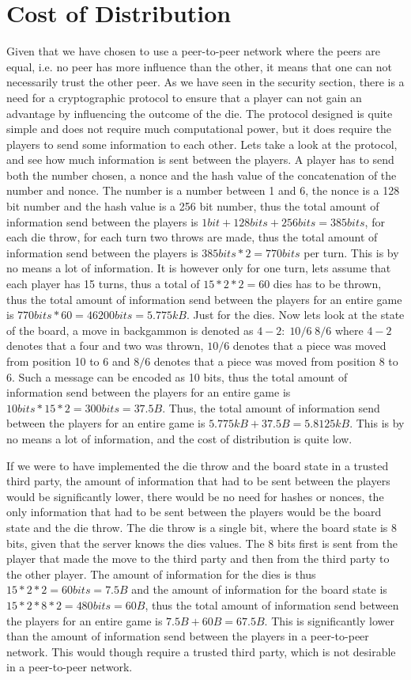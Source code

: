 \documentclass[ twoside,openright,titlepage,numbers=noenddot,headinclude,%
                footinclude=true,cleardoublepage=empty,abstractoff, %
                BCOR=5mm,paper=a4,fontsize=11pt,%
                ngerman,american,%
                ]{scrreprt}
\begin{document}
\section{Cost of Distribution}
Given that we have chosen to use a peer-to-peer network where the peers are equal, i.e. no peer has more influence than the other, it means that one can not necessarily trust the other peer. As we have seen in the security section, there is a need for a cryptographic protocol to ensure that a player can not gain an advantage by influencing the outcome of the die. The protocol designed is quite simple and does not require much computational power, but it does require the players to send some information to each other. Lets take a look at the protocol, and see how much information is sent between the players. A player has to send both the number chosen, a nonce and the hash value of the concatenation of the number and nonce. The number is a number between 1 and 6, the nonce is a 128 bit number and the hash value is a 256 bit number, thus the total amount of information send between the players is $1bit+128bits+256bits = 385bits$, for each die throw, for each turn two throws are made, thus the total amount of information send between the players is $385bits*2 = 770bits$ per turn. This is by no means a lot of information. It is however only for one turn, lets assume that each player has 15 turns, thus a total of $15*2*2 = 60$ dies has to be thrown, thus the total amount of information send between the players for an entire game is $770bits*60 = 46200bits = 5.775kB$. Just for the dies. Now lets look at the state of the board, a move in backgammon is denoted as $4-2:\; 10/6\; 8/6$ where $4-2$ denotes that a four and two was thrown, $10/6$ denotes that a piece was moved from position 10 to 6 and $8/6$ denotes that a piece was moved from position 8 to 6. Such a message can be encoded as 10 bits, thus the total amount of information send between the players for an entire game is $10bits*15*2 = 300bits = 37.5B$. Thus, the total amount of information send between the players for an entire game is $5.775kB + 37.5B = 5.8125kB$. This is by no means a lot of information, and the cost of distribution is quite low. 

If we were to have implemented the die throw and the board state in a trusted third party, the amount of information that had to be sent between the players would be significantly lower, there would be no need for hashes or nonces, the only information that had to be sent between the players would be the board state and the die throw. The die throw is a single bit, where the board state is 8 bits, given that the server knows the dies values. The 8 bits first is sent from the player that made the move to the third party and then from the third party to the other player. The amount of information for the dies is thus $15*2*2 = 60bits = 7.5B$ and the amount of information for the board state is $15*2*8*2 = 480bits = 60B$, thus the total amount of information send between the players for an entire game is $7.5B + 60B = 67.5B$. This is significantly lower than the amount of information send between the players in a peer-to-peer network. This would though require a trusted third party, which is not desirable in a peer-to-peer network.
\end{document}
